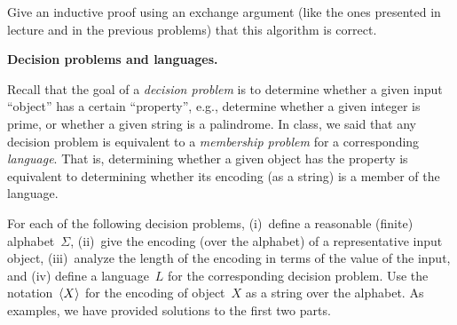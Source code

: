 \documentclass[11pt,addpoints]{exam}
\begin{document}
\begin{questions}
\begin{parts}
    Give an inductive proof using an exchange argument (like the ones presented in lecture and in the previous problems) that this algorithm is correct.

    
    \begin{solution}

    \end{solution}
  \end{parts}

  \question \textbf{Decision problems and languages.}

  Recall that the goal of a \emph{decision problem} is to determine whether a given input ``object'' has a certain ``property'', e.g., determine whether a given integer is prime, or whether a given string is a palindrome.
  In class, we said that any decision problem is equivalent to a \emph{membership problem} for a corresponding \emph{language}.
  That is, determining whether a given object has the property is equivalent to determining whether its encoding (as a string) is a member of the language.

  For each of the following decision problems, (i)~define a reasonable (finite) alphabet~$\Sigma$, (ii)~give the encoding (over the alphabet) of a representative input object, (iii)~analyze the length of the encoding in terms of the value of the input, and (iv) define a language~$L$ for the corresponding decision problem.
  Use the notation~$\langle X\rangle$ for the encoding of object~$X$ as a string over the alphabet.
  As examples, we have provided solutions to the first two parts.
  
\end{questions}
\end{document}
